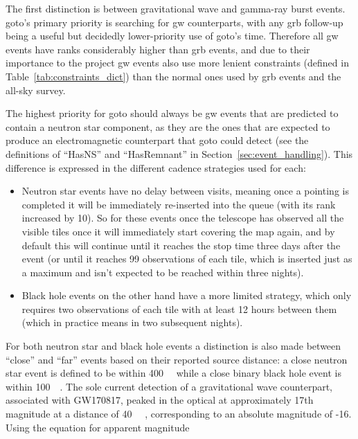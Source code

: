 \begin{colsection}
\begin{colsection}
The first distinction is between gravitational wave and gamma-ray burst events. \gls{goto}'s primary priority is searching for \gls{gw} counterparts, with any \gls{grb} follow-up being a useful but decidedly lower-priority use of \gls{goto}'s time. Therefore all \gls{gw} events have ranks considerably higher than \gls{grb} events, and due to their importance to the project \gls{gw} events also use more lenient constraints (defined in Table~\ref{tab:constraints_dict}) than the normal ones used by \gls{grb} events and the all-sky survey.

The highest priority for \gls{goto} should always be \gls{gw} events that are predicted to contain a neutron star component, as they are the ones that are expected to produce an electromagnetic counterpart that \gls{goto} could detect (see the definitions of ``HasNS'' and ``HasRemnant'' in Section~\ref{sec:event_handling}). This difference is expressed in the different cadence strategies used for each:

\begin{itemize}
    \item Neutron star events have no delay between visits, meaning once a pointing is completed it will be immediately re-inserted into the queue (with its rank increased by 10). So for these events once the telescope has observed all the visible tiles once it will immediately start covering the map again, and by default this will continue until it reaches the stop time three days after the event (or until it reaches 99 observations of each tile, which is inserted just as a maximum and isn't expected to be reached within three nights).
    \item Black hole events on the other hand have a more limited  strategy, which only requires two observations of each tile with at least 12 hours between them (which in practice means in two subsequent nights).
\end{itemize}

For both neutron star and black hole events a distinction is also made between ``close'' and ``far'' events based on their reported source distance: a close neutron star event is defined to be within \SI{400}{\mega\parsec} while a close binary black hole event is within \SI{100}{\mega\parsec}. The sole current detection of a gravitational wave counterpart, associated with GW170817, peaked in the optical at approximately 17th magnitude at a distance of \SI{40}{\mega\parsec} \citep{GW170817_followup}, corresponding to an absolute magnitude of -16. Using the equation for apparent magnitude


\end{colsection}
\end{colsection}
